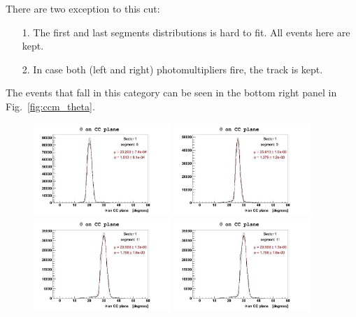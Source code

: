 There are two exception to this cut:
\begin{itemize}
 \item [1.] The first and last segments distributions is hard to fit. All events here are kept.
 \item [2.] In case both (left and right) photomultipliers fire, the track is kept.
\end{itemize}
The events that fall in this category can be seen in the bottom right panel in Fig.~\ref{fig:ccm_theta}.

\begin{figure}[h]
  \centering
		\includegraphics[width=0.46\textwidth]{img/ccm_slice6_fit_sect1.jpg}
		\includegraphics[width=0.46\textwidth]{img/ccm_slice9_fit_sect1.jpg}
		\includegraphics[width=0.46\textwidth]{img/ccm_slice11_fit_sect1.jpg}
		\includegraphics[width=0.46\textwidth]{img/ccm_slice14_fit_sect1.jpg}

\end{figure}
